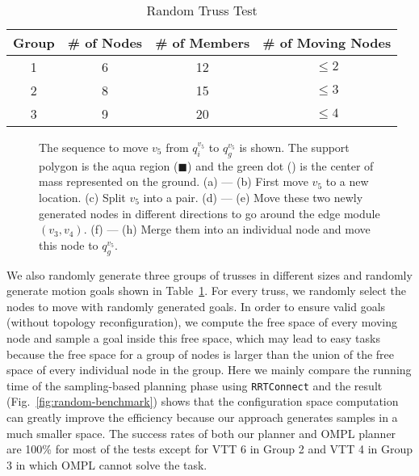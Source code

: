 \documentclass[journal]{IEEEtran}
\begin{document}
\begin{table}[b]
  \centering
  \caption{Random Truss Test}
  \begin{tabular}{cccc}
    \toprule
    Group&\# of Nodes&\# of Members&\# of Moving Nodes\\
    \midrule
    1&6&12&$\le 2$\\
    2&8&15&$\le 3$\\
    3&9&20&$\le 4$\\
    \bottomrule
  \end{tabular}
  \label{tab:random-truss}
\end{table}

\begin{figure}[t!]
  \centering
  \hfil
  \hfil
  \hfil
  \hfil
  \hfil
  \hfil
 \hfil
  \caption{The sequence to move $v_5$ from $q_i^{v_5}$ to $q_g^{v_5}$
    is shown. The support polygon is the aqua region
    ({\color[rgb]{0,1,1}$\blacksquare$}) and the green dot
    ({\color{green}{$\bullet$}}) is the center of mass represented on
    the ground. (a) --- (b) First move $v_5$ to a new location. (c)
    Split $v_5$ into a pair. (d) --- (e) Move these two newly
    generated nodes in different directions to go around the edge
    module $(v_3, v_4)$. (f) --- (h) Merge them into an individual
    node and move this node to $q_g^{v_5}$.}
  \label{fig:topology-reconfig-process}
\end{figure}

We also randomly generate three groups of trusses in different sizes
and randomly generate motion goals shown in
Table~\ref{tab:random-truss}. For every truss, we randomly select the
nodes to move with randomly generated goals. In order to ensure valid
goals (without topology reconfiguration), we compute the free space of
every moving node and sample a goal inside this free space, which may
lead to easy tasks because the free space for a group of nodes is
larger than the union of the free space of every individual node in
the group. Here we mainly compare the running time of the
sampling-based planning phase using \texttt{RRTConnect} and the result
(Fig.~\ref{fig:random-benchmark}) shows that the configuration space
computation can greatly improve the efficiency because our approach
generates samples in a much smaller space. The success rates of both
our planner and OMPL planner are 100\% for most of the tests except
for VTT 6 in Group 2 and VTT 4 in Group 3 in which OMPL cannot solve
the task.
\end{document}
